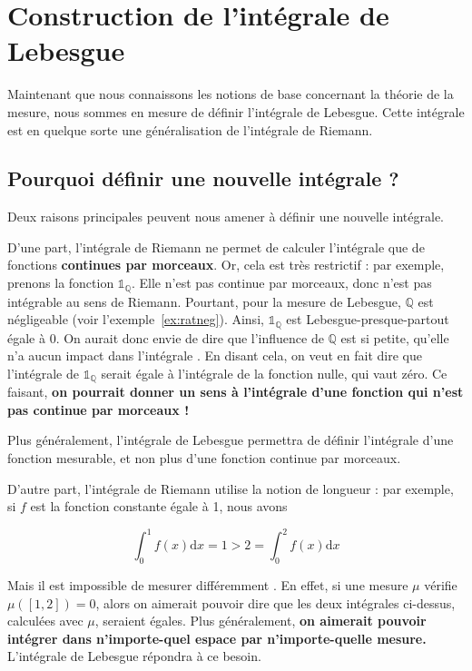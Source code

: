 \documentclass[../integ-proba.tex]{subfiles}
\begin{document}
  \chapter{Construction de l'intégrale de Lebesgue}

  Maintenant que nous connaissons les notions de base concernant la théorie de la mesure, nous sommes en mesure de définir l'intégrale de Lebesgue.
  Cette intégrale est en quelque sorte une généralisation de l'intégrale de Riemann.

  \section{Pourquoi définir une nouvelle intégrale ?}

  Deux raisons principales peuvent nous amener à définir une nouvelle intégrale.

  D'une part, l'intégrale de Riemann ne permet de calculer l'intégrale que de fonctions \textbf{continues par morceaux}.
  Or, cela est très restrictif : par exemple, prenons la fonction $\mathds{1}_{\mathbb{Q}}$.
  Elle n'est pas continue par morceaux, donc n'est pas intégrable au sens de Riemann.
  Pourtant, pour la mesure de Lebesgue, $\mathbb{Q}$ est négligeable (voir l'exemple~\ref{ex:ratneg}).
  Ainsi, $\mathds{1}_{\mathbb{Q}}$ est Lebesgue-presque-partout égale à $0$.
  On aurait donc envie de dire que \og l'influence de $\mathbb{Q}$ est si petite, qu'elle n'a aucun impact dans l'intégrale \fg.
  En disant cela, on veut en fait dire que l'intégrale de $\mathds{1}_{\mathbb{Q}}$ serait égale à l'intégrale de la fonction nulle, qui vaut zéro.
  Ce faisant, \textbf{on pourrait donner un sens à l'intégrale d'une fonction qui n'est pas continue par morceaux !}

  Plus généralement, l'intégrale de Lebesgue permettra de définir l'intégrale d'une fonction mesurable, et non plus d'une fonction continue par morceaux.

  D'autre part, l'intégrale de Riemann utilise la notion de longueur :
  par exemple, si $f$ est la fonction constante égale à 1, nous avons

  \begin{displaymath}
    \int_0^1 f(x)\text{d}x = 1 > 2 = \int_0^2 f(x)\text{d}x
  \end{displaymath}


  Mais il est impossible de \og mesurer différemment \fg.
  En effet, si une mesure $\mu$ vérifie $\mu\left(\left[1,2\right]\right)=0$, alors on aimerait pouvoir dire que les deux intégrales ci-dessus, calculées avec $\mu$, seraient égales.
  Plus généralement, \textbf{on aimerait pouvoir intégrer dans n'importe-quel espace par n'importe-quelle mesure.}
  L'intégrale de Lebesgue répondra à ce besoin.
\end{document}
